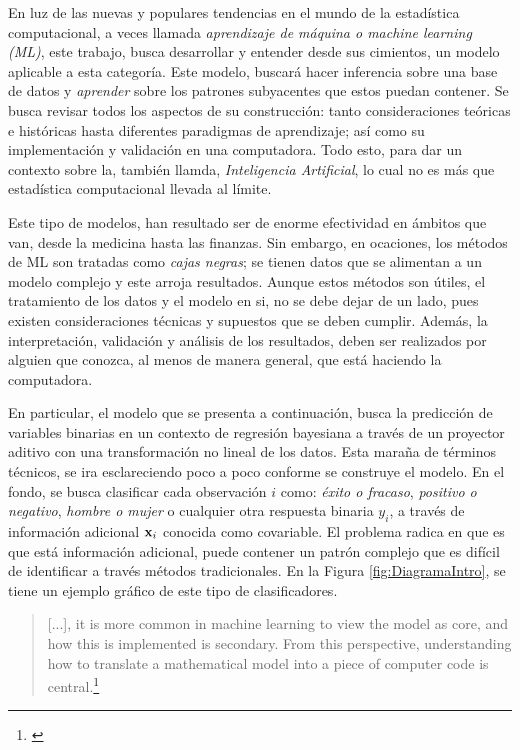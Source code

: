 \documentclass[../Main/Main.tex]{subfiles}
\begin{document}
En luz de las nuevas y populares tendencias en el mundo de la estadística computacional, a veces llamada \textit{aprendizaje de máquina o machine learning (ML)}, este trabajo, busca desarrollar y entender desde sus cimientos, un modelo aplicable a esta categoría. Este modelo, buscará hacer inferencia sobre una base de datos y \textit{aprender} sobre los patrones subyacentes que estos puedan contener. Se busca revisar todos los aspectos de su construcción: tanto consideraciones teóricas e históricas hasta diferentes paradigmas de aprendizaje; así como su implementación y validación en una computadora. Todo esto, para dar un contexto sobre la, también llamda, \textit{Inteligencia Artificial}, lo cual no es más que estadística computacional llevada al límite.

Este tipo de modelos, han resultado ser de enorme efectividad en  ámbitos que van, desde la medicina hasta las finanzas. Sin embargo, en ocaciones, los métodos de ML son tratadas como \textit{cajas negras}; se tienen datos que se alimentan a un modelo complejo y este arroja resultados. Aunque estos métodos son útiles, el tratamiento de los datos y el modelo en si, no se debe dejar de un lado, pues existen consideraciones técnicas y supuestos que se deben cumplir. Además, la interpretación, validación y análisis de los resultados, deben ser realizados por alguien que conozca, al menos de manera general, que está haciendo la computadora.

En particular, el modelo que se presenta a continuación, busca la predicción de variables binarias en un contexto de regresión bayesiana a través de un proyector aditivo con una transformación no lineal de los datos. Esta maraña de términos técnicos, se ira esclareciendo poco a poco conforme se construye el modelo. En el fondo, se busca clasificar cada observación $i$ como: \textit{éxito o fracaso}, \textit{positivo o negativo}, \textit{hombre o mujer} o cualquier otra respuesta binaria $y_i$, a través de información adicional $\mathbf{x}_i$ conocida como covariable. El problema radica en que es que está información adicional, puede contener un patrón complejo que es difícil de identificar a través métodos tradicionales. En la Figura \ref{fig:DiagramaIntro}, se tiene un ejemplo gráfico de este tipo de clasificadores. 

\begin{quote}
	[...], it is more common in machine learning to view the model as core, and how this is implemented
is secondary. From this perspective, understanding how to translate a mathematical model into a piece of
computer code is central.\footnote{\autocite{barber2012bayesian}}
\end{quote}
\end{document}
